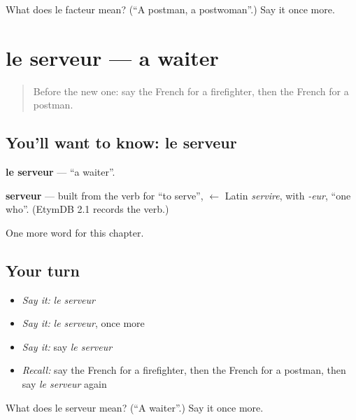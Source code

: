 \begin{tcolorbox}[breakable,colback=teal!4,colframe=teal!35!black,title={Before you move on}]
What does le facteur mean? (\textquotedblleft{}A postman, a postwoman\textquotedblright{}.) Say it once more.
\end{tcolorbox}
\section[le serveur]{le serveur — a waiter}

\label{lesson:FR-C125-serveur}



\begin{quote}
Before the new one: say the French for a firefighter, then the French for a postman.
\end{quote}

\subsection*{You'll want to know: le serveur}
\textbf{le serveur} — \textquotedblleft{}a waiter\textquotedblright{}.

\begin{cousinweb}
\textbf{serveur} — built from the verb for \textquotedblleft{}to serve\textquotedblright{}, $\leftarrow$ Latin \emph{servire}, with \emph{-eur}, \textquotedblleft{}one who\textquotedblright{}. (EtymDB 2.1 records the verb.)
\end{cousinweb}

\begin{grammarlens}[title={What you've built}]
One more word for this chapter.
\end{grammarlens}

\subsection*{Your turn}
\begin{itemize}
\raggedright
  \item \emph{Say it:} \emph{le serveur}
  \item \emph{Say it:} \emph{le serveur}, once more
  \item \emph{Say it:} say \emph{le serveur}
  \item \emph{Recall:} say the French for a firefighter, then the French for a postman, then say \emph{le serveur} again
\end{itemize}

\begin{tcolorbox}[breakable,colback=teal!4,colframe=teal!35!black,title={Before you move on}]
What does le serveur mean? (\textquotedblleft{}A waiter\textquotedblright{}.) Say it once more.
\end{tcolorbox}
